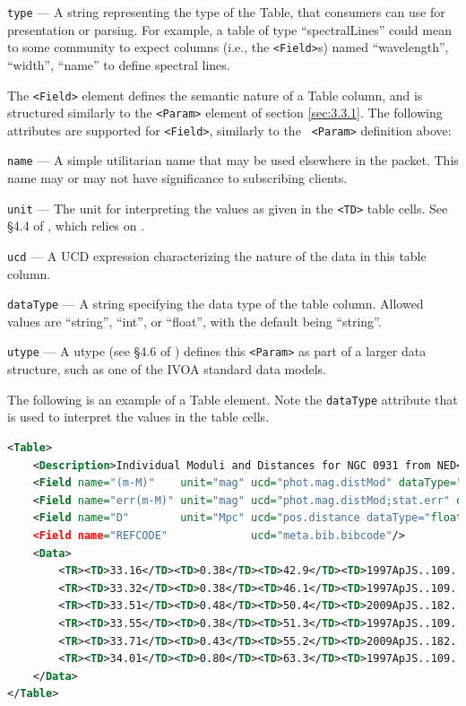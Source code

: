 \documentclass[11pt,a4paper]{ivoa}
\begin{document}
 {\tt type}\label{sec:3.3.3.2} --- A string representing 
the type of the Table, that consumers can use for presentation or parsing. For 
example, a table of type ``spectralLines'' could mean to some community to 
expect columns (i.e., the {\tt <Field>}s) named ``wavelength'', ``width'', 
``name'' to define spectral lines. 

The {\tt <Field>} element defines the semantic nature of a Table column, and is 
structured similarly to the {\tt <Param>} element of section \ref{sec:3.3.1}. 
The following attributes are supported for {\tt <Field>}, similarly to the {\tt 
<Param>} definition above: 

 {\tt name}\label{sec:3.3.3.3} --- A simple utilitarian 
name that may be used elsewhere in the packet. This name may or may not have 
significance to subscribing clients. 

 {\tt unit}\label{sec:3.3.3.4} --- The unit for 
interpreting the values as given in the {\tt <TD>} table cells. See \S4.4 of 
\citep{2019ivoa.spec.1021O}, which relies on \citep{2014ivoa.spec.0523D}. 

 {\tt ucd}\label{sec:3.3.3.5} --- A UCD 
\citep{2018ivoa.spec.0527P} expression characterizing the nature of the data in 
this table column. 

 {\tt dataType}\label{sec:3.3.3.6} --- A string specifying 
the data type of the table column. Allowed values are ``string'', ``int'', or 
``float'', with the default being ``string''.
 
 {\tt utype}\label{sec:3.3.3.7} --- A utype (see \S4.6 of 
\citep{2019ivoa.spec.1021O}) defines this {\tt <Param>} as part of a larger data 
structure, such as one of the IVOA standard data models. 
 
 The following is an example of a Table element. Note the {\tt dataType} 
 attribute that is used to interpret the values in the table cells. 
\begin{lstlisting}[language=XML]
<Table>
    <Description>Individual Moduli and Distances for NGC 0931 from NED</Description>
    <Field name="(m-M)"    unit="mag" ucd="phot.mag.distMod" dataType="float"/>
    <Field name="err(m-M)" unit="mag" ucd="phot.mag.distMod;stat.err" dataType="float"/>
    <Field name="D"        unit="Mpc" ucd="pos.distance dataType="float"/>
    <Field name="REFCODE"             ucd="meta.bib.bibcode"/>
    <Data>
        <TR><TD>33.16</TD><TD>0.38</TD><TD>42.9</TD><TD>1997ApJS..109..333W</TD></TR>
        <TR><TD>33.32</TD><TD>0.38</TD><TD>46.1</TD><TD>1997ApJS..109..333W</TD></TR>
        <TR><TD>33.51</TD><TD>0.48</TD><TD>50.4</TD><TD>2009ApJS..182..474S</TD></TR>
        <TR><TD>33.55</TD><TD>0.38</TD><TD>51.3</TD><TD>1997ApJS..109..333W</TD></TR>
        <TR><TD>33.71</TD><TD>0.43</TD><TD>55.2</TD><TD>2009ApJS..182..474S</TD></TR>
        <TR><TD>34.01</TD><TD>0.80</TD><TD>63.3</TD><TD>1997ApJS..109..333W</TD></TR>
    </Data>
</Table> 
\end{lstlisting}
\end{document}
